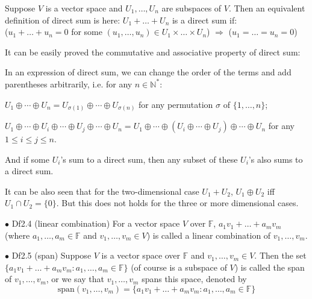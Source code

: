 \documentclass{article}
\begin{document}
\begin{Rmk}{}
    \begin{compactenum}
        \item Suppose $V$ is a vector space and $U_1, \dots, U_n$ are subspaces of $V$. Then an equivalent definition of direct sum is here: \textcolor{Th}{$U_1+\dots+U_n$ is a direct sum if: \\
        ($u_1+\dots + u_n = 0$ for some $(u_1, \dots, u_n)\in U_1\times\dots\times U_n$) $\Rightarrow$ ($u_1 = \dots = u_n = 0$)}
        \item It can be easily proved the commutative and associative property of direct sum: \textcolor{Th}{In an expression of direct sum, we can change the order of the terms and add parentheses arbitrarily, i.e. for any $n\in\mathbb{N}^\ast$:
        \begin{compactenum}
            \item $U_1\oplus\cdots\oplus U_n = U_{\sigma(1)}\oplus\cdots\oplus U_{\sigma(n)}$ for any permutation $\sigma$ of $\{1, \dots, n\}$;
            \item $U_1\oplus\cdots\oplus U_i\oplus\cdots\oplus U_j\oplus \cdots\oplus U_n = U_1\oplus\cdots\oplus \left(U_i\oplus\cdots\oplus U_j\right)\oplus\cdots\oplus U_n$ for any $1\leq i\leq j\leq n$.
        \end{compactenum}}
        And \textcolor{Th}{if some $U_i$'s sum to a direct sum, then any subset of these $U_i$'s also sums to a direct sum.}
        \item It can be also seen that \textcolor{Th}{for the two-dimensional case $U_1+U_2$, $U_1\oplus U_2$ iff $U_1\cap U_2 = \{0\}$. But this does not holds for the three or more dimensional cases.}
    \end{compactenum}
\end{Rmk}

\begin{Df}{$\bullet$ Df2.4 (linear combination)}
    For a vector space $V$ over $\mathbb{F}$, $a_1v_1+\dots+a_mv_m$ (where $a_1,\dots, a_m\in \mathbb{F}$ and $v_1,\dots, v_m\in V$) is called a linear combination of $v_1, \dots, v_m$.
\end{Df}

\begin{Df}{$\bullet$ Df2.5 (span)}
    Suppose $V$ is a vector space over $\mathbb{F}$ and $v_1, \dots, v_m\in V$. Then the set $\{a_1v_1+\dots+a_mv_m: a_1,\dots,a_m\in\mathbb{F}\}$ (of course is a subspace of $V$) is called the span of $v_1, \dots, v_m$, or we say that $v_1, \dots, v_m$ spans this space, denoted by 
    $$\text{span} (v_1, \dots, v_m) = \{a_1v_1+\dots+a_mv_m: a_1,\dots,a_m\in\mathbb{F}\}$$
\end{Df}
\end{document}
